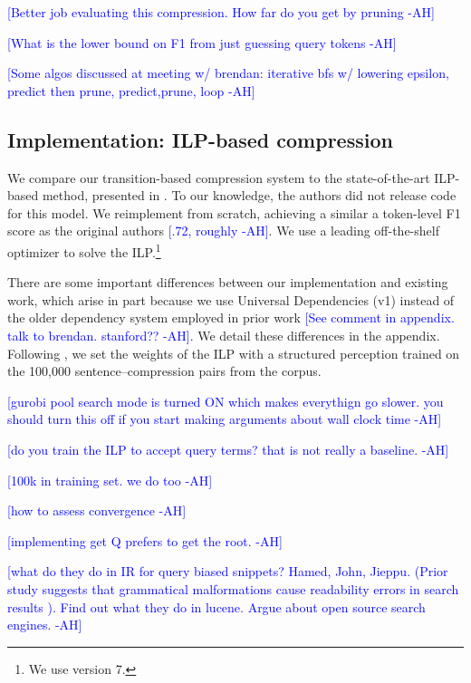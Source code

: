 \documentclass[11pt,a4paper]{article}
\newcommand{\ahcomment}[1]{\textcolor{blue}{[#1 -AH]}}
\begin{document}
\ahcomment{Better job evaluating this compression. How far do you get  by pruning}

\ahcomment{What is the lower bound on F1 from just guessing query tokens} 

\ahcomment{Some algos discussed at meeting w/ brendan: iterative bfs w/ lowering epsilon, predict then prune, predict,prune, loop}

\subsection{Implementation: ILP-based compression}\label{s:ilp}

We compare our transition-based compression system to the state-of-the-art ILP-based method, presented in \citet{filippova2013overcoming}. To our knowledge, the authors did not release code for this model. We reimplement from scratch, achieving a similar a token-level F1 score as the original authors \ahcomment{.72, roughly}. We use a leading off-the-shelf optimizer \cite{gurobi} to solve the ILP.\footnote{We use version 7.} 

There are some important differences between our implementation and existing work, which arise in part because we use Universal Dependencies (v1) instead of the older dependency system employed in prior work \ahcomment{See comment in appendix. talk to brendan. stanford??}. We detail these differences in the appendix. Following \citet{filippova2013overcoming}, we set the weights of the ILP with a structured perception trained on the 100,000 sentence--compression pairs from the corpus.

\ahcomment{gurobi pool search mode is turned ON which makes everythign go slower. you should turn this off if you start making arguments about wall clock time}

\ahcomment{do you train the ILP to accept query terms? that is not really a baseline. }

\ahcomment{100k in training set. we do too }

\ahcomment{how to assess convergence}

\ahcomment{implementing get Q prefers to get the root. }


\ahcomment{what do they do in IR for query biased snippets? Hamed, John, Jieppu.
 (Prior study suggests that grammatical malformations cause readability errors in search results \cite{kanungo2009predicting}).
 Find out what they do in lucene. Argue about open source search engines. }
\end{document}
